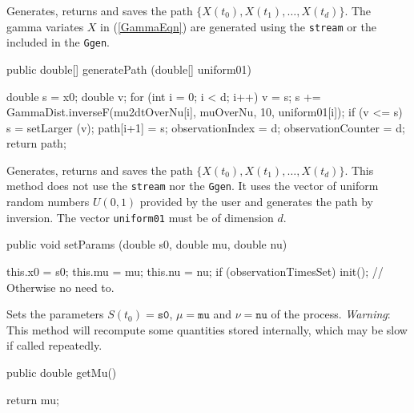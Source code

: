 \begin{tabb}
Generates, returns and saves the path
$\{X(t_{0}), X(t_{1}), \ldots, X(t_{d})\}$.
The gamma variates $X$ in (\ref{GammaEqn}) are generated using the
 \texttt{stream}
or the  included
in the  \texttt{Ggen}.
\end{tabb}
\begin{code}

   public double[] generatePath (double[] uniform01) \begin{hide} {
        double s = x0;
        double v;
        for (int i = 0; i < d; i++) {
            v = s;
            s += GammaDist.inverseF(mu2dtOverNu[i], muOverNu, 10, uniform01[i]);
            if (v <= s)
                s = setLarger (v);
            path[i+1] = s;
        }
        observationIndex   = d;
        observationCounter = d;
        return path;
    } \end{hide}
\end{code}
\begin{tabb} Generates, returns and saves the path $
\{X(t_{0}), X(t_{1}), \ldots, X(t_{d})\}$. This method does not use the
 \texttt{stream} nor the
 \texttt{Ggen}. It
uses the vector of uniform random numbers $U(0, 1)$ provided by the user
and generates the path by inversion.  The vector \texttt{uniform01} must be of
dimension $d$.
\end{tabb}
\begin{code}

   public void setParams (double s0, double mu, double nu) \begin{hide} {
        this.x0 = s0;
        this.mu = mu;
        this.nu = nu;
        if (observationTimesSet) init(); // Otherwise no need to.
}\end{hide}
\end{code}
\begin{tabb} Sets the parameters  $S(t_{0}) = \texttt{s0}$,
$\mu = \texttt{mu}$ and $\nu = \texttt{nu}$ of the process.
\emph{Warning}: This method will recompute some quantities stored internally,
which may be slow if called repeatedly.
\end{tabb}
\begin{code}

   public double getMu() \begin{hide} { return mu; }\end{hide}
\end{code}
